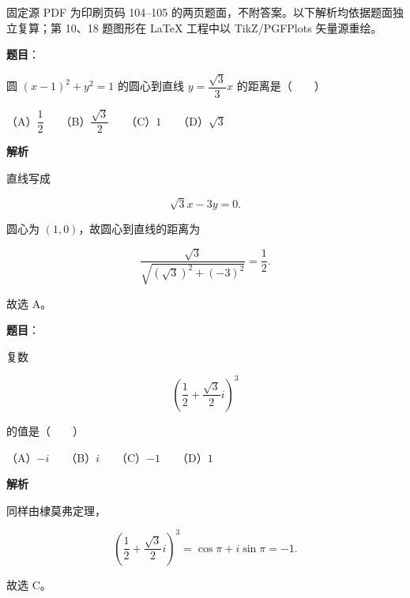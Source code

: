 

\begin{gktip}
固定源 PDF 为印刷页码 104–105 的两页题面，不附答案。以下解析均依据题面独立复算；第 10、18 题图形在 LaTeX 工程中以 TikZ/PGFPlots 矢量源重绘。
\end{gktip}


\begin{answer}

\textbf{题目}：

圆 $(x-1)^2+y^2=1$ 的圆心到直线 $y=\dfrac{\sqrt3}{3}x$ 的距离是\mbox{（　　）}

（A）$\dfrac12$　　（B）$\dfrac{\sqrt3}{2}$　　（C）$1$　　（D）$\sqrt3$

\textbf{解析}

直线写成

\nopagebreak[4]
\[
\sqrt3x-3y=0.
\]

圆心为 $(1,0)$，故圆心到直线的距离为

\nopagebreak[4]
\[
\frac{\sqrt3}{\sqrt{(\sqrt3)^2+(-3)^2}}
=\frac12.
\]

故选 A。


\end{answer}
\begin{answer}

\textbf{题目}：

复数

\nopagebreak[4]
\[
\left(\frac12+\frac{\sqrt3}{2}i\right)^3
\]

的值是\mbox{（　　）}

（A）$-i$　　（B）$i$　　（C）$-1$　　（D）$1$

\textbf{解析}

同样由棣莫弗定理，

\nopagebreak[4]
\[
\left(\frac12+\frac{\sqrt3}{2}i\right)^3
=\cos\pi+i\sin\pi=-1.
\]

故选 C。


\end{answer}
